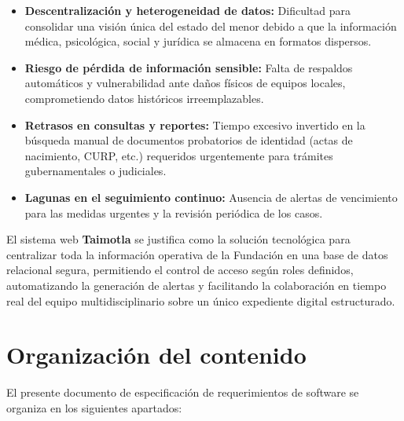 \begin{itemize}
	\item \textbf{Descentralización y heterogeneidad de datos:} Dificultad para consolidar una visión única del estado del menor debido a que la información médica, psicológica, social y jurídica se almacena en formatos dispersos.
	\item \textbf{Riesgo de pérdida de información sensible:} Falta de respaldos automáticos y vulnerabilidad ante daños físicos de equipos locales, comprometiendo datos históricos irreemplazables.
	\item \textbf{Retrasos en consultas y reportes:} Tiempo excesivo invertido en la búsqueda manual de documentos probatorios de identidad (actas de nacimiento, CURP, etc.) requeridos urgentemente para trámites gubernamentales o judiciales.
	\item \textbf{Lagunas en el seguimiento continuo:} Ausencia de alertas de vencimiento para las medidas urgentes y la revisión periódica de los casos.
\end{itemize}

El sistema web \textbf{Taimotla} se justifica como la solución tecnológica para centralizar toda la información operativa de la Fundación en una base de datos relacional segura, permitiendo el control de acceso según roles definidos, automatizando la generación de alertas y facilitando la colaboración en tiempo real del equipo multidisciplinario sobre un único expediente digital estructurado.

\section{Organización del contenido}

El presente documento de especificación de requerimientos de software se organiza en los siguientes apartados:


